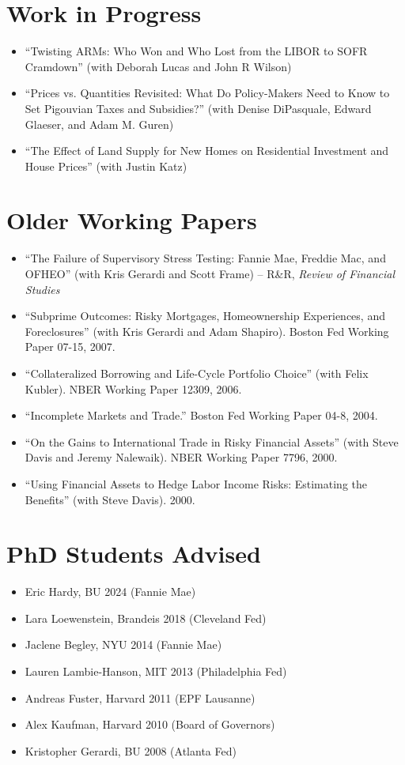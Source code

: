 \documentclass[11pt]{article}
\begin{document}
\section*{Work in Progress}
\begin{itemize}[leftmargin=*, nosep]
\item ``Twisting ARMs: Who Won and Who Lost from the LIBOR to SOFR Cramdown'' (with Deborah Lucas and John R Wilson)
\item ``Prices vs. Quantities Revisited: What Do Policy-Makers Need to Know to Set Pigouvian Taxes and Subsidies?'' (with Denise DiPasquale, Edward Glaeser, and Adam M. Guren)
\item ``The Effect of Land Supply for New Homes on Residential Investment and House Prices'' (with Justin Katz)
\end{itemize}

\section*{Older Working Papers}
\begin{itemize}[leftmargin=*, nosep]
\item ``The Failure of Supervisory Stress Testing: Fannie Mae, Freddie Mac, and OFHEO'' (with Kris Gerardi and Scott Frame) -- R\&R, \textit{Review of Financial Studies}
\item ``Subprime Outcomes: Risky Mortgages, Homeownership Experiences, and Foreclosures'' (with Kris Gerardi and Adam Shapiro). Boston Fed Working Paper 07-15, 2007.
\item ``Collateralized Borrowing and Life-Cycle Portfolio Choice'' (with Felix Kubler). NBER Working Paper 12309, 2006.
\item ``Incomplete Markets and Trade.'' Boston Fed Working Paper 04-8, 2004.
\item ``On the Gains to International Trade in Risky Financial Assets'' (with Steve Davis and Jeremy Nalewaik). NBER Working Paper 7796, 2000.
\item ``Using Financial Assets to Hedge Labor Income Risks: Estimating the Benefits'' (with Steve Davis). 2000.
\end{itemize}

\section*{PhD Students Advised}
\begin{itemize}[leftmargin=*, nosep]
\item Eric Hardy, BU 2024 (Fannie Mae)
\item Lara Loewenstein, Brandeis 2018 (Cleveland Fed)
\item Jaclene Begley, NYU 2014 (Fannie Mae)
\item Lauren Lambie-Hanson, MIT 2013 (Philadelphia Fed)
\item Andreas Fuster, Harvard 2011 (EPF Lausanne)
\item Alex Kaufman, Harvard 2010 (Board of Governors)
\item Kristopher Gerardi, BU 2008 (Atlanta Fed)
\end{itemize}
\end{document}
